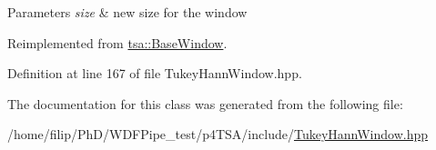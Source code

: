 \begin{DoxyParams}{Parameters}
{\em size} & new size for the window \\
\hline
\end{DoxyParams}


Reimplemented from \hyperlink{classtsa_1_1_base_window_a8a2a3425f2915762d50fa57dd0e04f22}{tsa\+::\+Base\+Window}.



Definition at line 167 of file Tukey\+Hann\+Window.\+hpp.



The documentation for this class was generated from the following file\+:\begin{DoxyCompactItemize}
\item 
/home/filip/\+Ph\+D/\+W\+D\+F\+Pipe\+\_\+test/p4\+T\+S\+A/include/\hyperlink{_tukey_hann_window_8hpp}{Tukey\+Hann\+Window.\+hpp}\end{DoxyCompactItemize}
